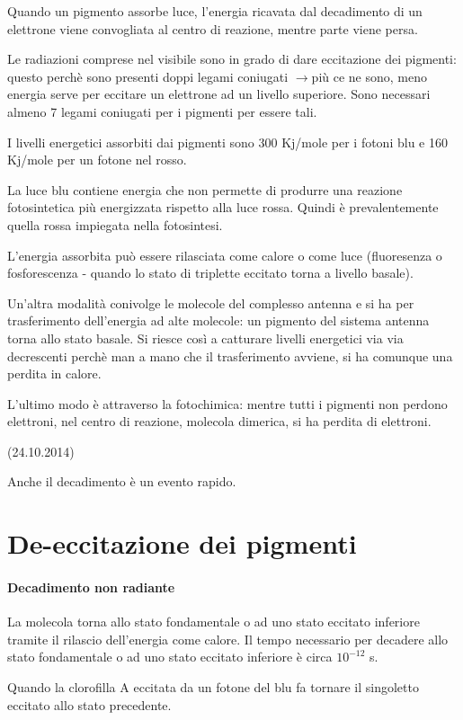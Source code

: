 \documentclass[a4paper,12pt]{book}
\newcommand{\lfreccia}{\ensuremath{\longrightarrow}}
\begin{document}
Quando un pigmento assorbe luce, l’energia ricavata dal decadimento di un elettrone viene convogliata al centro di reazione, mentre parte viene persa.

Le radiazioni comprese nel visibile sono in grado di dare eccitazione dei pigmenti: questo perchè sono presenti doppi legami coniugati \lfreccia più ce ne sono, meno energia serve per eccitare un elettrone ad un livello superiore. Sono necessari almeno 7 legami coniugati per i pigmenti per essere tali.

I livelli energetici assorbiti dai pigmenti sono 300 Kj/mole per i fotoni blu  e 160 Kj/mole per un fotone nel rosso.

La luce blu contiene energia che non permette di produrre una reazione fotosintetica più energizzata rispetto alla luce rossa. Quindi è prevalentemente quella rossa impiegata nella fotosintesi.

L’energia assorbita può essere rilasciata come calore o come luce (fluoresenza o fosforescenza - quando lo stato di triplette eccitato torna a livello basale).

Un’altra modalità conivolge le molecole del complesso antenna e si ha per trasferimento dell’energia ad alte molecole: un pigmento del sistema antenna torna allo stato basale. Si riesce così a catturare livelli energetici via via decrescenti perchè man a mano che il trasferimento avviene, si ha comunque una perdita in calore.

L’ultimo modo è attraverso la fotochimica: mentre tutti i pigmenti non perdono elettroni, nel centro di reazione, molecola dimerica, si ha perdita di elettroni.

(24.10.2014)

Anche il decadimento è un evento rapido.

\section{De-eccitazione dei pigmenti}
\paragraph{Decadimento non radiante}
La molecola torna allo stato fondamentale o ad uno stato eccitato inferiore tramite il rilascio
dell’energia come calore.
Il tempo necessario per decadere allo stato fondamentale o ad uno stato eccitato inferiore è circa
$10^{-12}$ s.

Quando la clorofilla A eccitata da un fotone del blu fa tornare il singoletto eccitato allo stato precedente.
\end{document}
